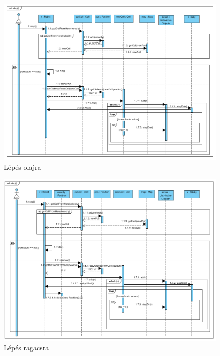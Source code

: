 \begin{figure}[!htbp]
	\begin{center}
		\includegraphics[width=18cm]{./chapters/chapter05/stepoilysequence.png}
		\caption{Lépés olajra}
	\end{center}
\end{figure}

\clearpage

\begin{figure}[!htbp]
	\begin{center}
		\includegraphics[width=18cm]{./chapters/chapter05/stepstickysequence.png}
		\caption{Lépés ragacsra}
	\end{center}
\end{figure}




